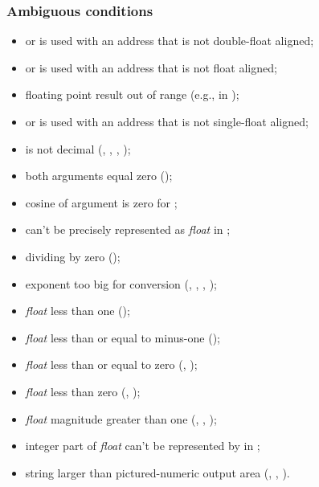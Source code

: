 \subsubsection{Ambiguous conditions} %
\begin{itemize}
\item {} or  is used with an address that is not
	double-float aligned;
\item {} or  is used with an address that is not
	float aligned;
\item floating point result out of range
	(e.g., in );
\item {} or  is used with an address that is not
	single-float aligned;
\item {} is not decimal
	(,
	 ,
	 ,
	 );
\item both arguments equal zero ();
\item cosine of argument is zero for ;
\item {} can't be precisely represented as \emph{float} in
	;
\item dividing by zero ();
\item exponent too big for conversion
	(,
	 ,
	 ,
	 );
\item \emph{float} less than one ();
\item \emph{float} less than or equal to minus-one
	();
\item \emph{float} less than or equal to zero
	(,
	 );
\item \emph{float} less than zero
	(,
	 );
\item \emph{float} magnitude greater than one
	(,
	 ,
	 );
\item integer part of \emph{float} can't be represented by  in
	;
\item string larger than pictured-numeric output area
	(,
	 ,
	 ).
\end{itemize}


